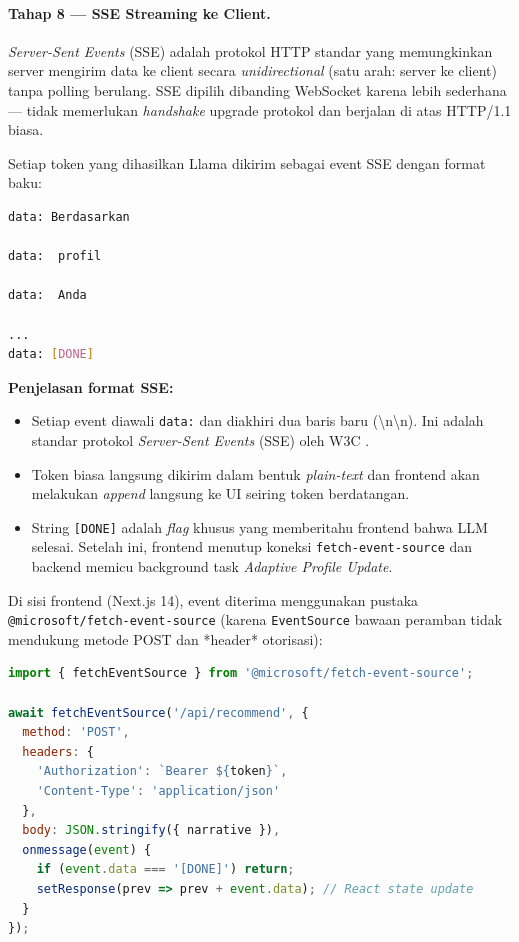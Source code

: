 \paragraph{Tahap 8 --- SSE Streaming ke Client.}
\textit{Server-Sent Events} (SSE) adalah protokol HTTP standar yang memungkinkan
server mengirim data ke client secara \textit{unidirectional} (satu arah: server ke client)
tanpa polling berulang. SSE dipilih dibanding WebSocket karena lebih sederhana ---
tidak memerlukan \textit{handshake} upgrade protokol dan berjalan di atas HTTP/1.1 biasa.

Setiap token yang dihasilkan Llama dikirim sebagai event SSE dengan format baku:
\begin{lstlisting}[language=bash, caption={Format SSE Event per Token}]
data: Berdasarkan

data:  profil

data:  Anda

...
data: [DONE]
\end{lstlisting}

\noindent \textbf{Penjelasan format SSE:}
\begin{itemize}[noitemsep]
  \item Setiap event diawali \texttt{data:} dan diakhiri dua baris baru (\textbackslash{}n\textbackslash{}n).
    Ini adalah standar protokol \textit{Server-Sent Events} (SSE) oleh W3C \cite{Hickson2015}.
  \item Token biasa langsung dikirim dalam bentuk \textit{plain-text} dan frontend
    akan melakukan \textit{append} langsung ke UI seiring token berdatangan.
  \item String \texttt{[DONE]} adalah \textit{flag} khusus yang memberitahu frontend bahwa LLM selesai.
    Setelah ini, frontend menutup koneksi \texttt{fetch-event-source} dan backend
    memicu background task \textit{Adaptive Profile Update}.
\end{itemize}

Di sisi frontend (Next.js 14), event diterima menggunakan pustaka \texttt{@microsoft/fetch-event-source} (karena \texttt{EventSource} bawaan peramban tidak mendukung metode POST dan *header* otorisasi):
\begin{lstlisting}[language=JavaScript, caption={Konsumsi SSE di Frontend Next.js}]
import { fetchEventSource } from '@microsoft/fetch-event-source';

await fetchEventSource('/api/recommend', {
  method: 'POST',
  headers: { 
    'Authorization': `Bearer ${token}`,
    'Content-Type': 'application/json' 
  },
  body: JSON.stringify({ narrative }),
  onmessage(event) {
    if (event.data === '[DONE]') return;
    setResponse(prev => prev + event.data); // React state update
  }
});
\end{lstlisting}

